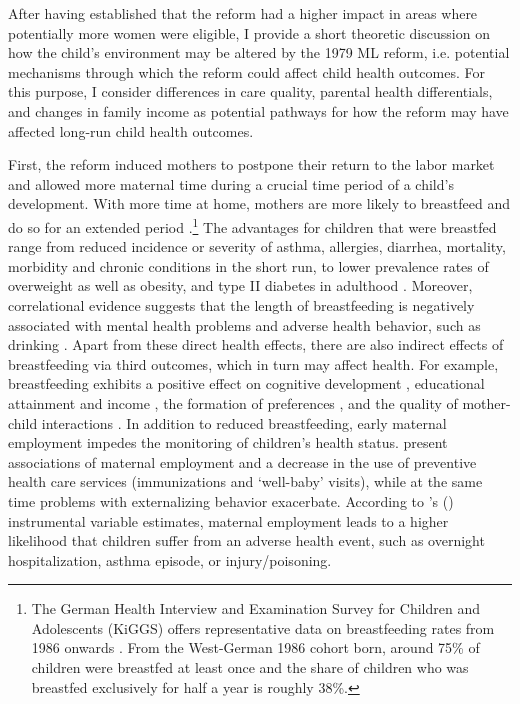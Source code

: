 
After having established that the reform had a higher impact in areas where potentially more women were eligible, I provide a short theoretic discussion on how the child's environment may be altered by the 1979 ML reform, i.e. potential mechanisms through which the reform could affect child health outcomes. For this purpose, I consider differences in care quality, parental health differentials, and changes in family income as potential pathways for how the reform may have affected long-run child health outcomes.%

First, the reform induced mothers to postpone their return to the labor market and allowed more maternal time during a crucial time period of a child's development. With more time at home, mothers are more likely to breastfeed and do so for an extended period \citep{baker2008maternal,berger2005earlymaternal}.\footnote{The German Health Interview and Examination Survey for Children and Adolescents (KiGGS) offers representative data on breastfeeding rates from 1986 onwards \citep{lange2007breastfeeding}. From the West-German 1986 cohort born, around 75\% of children were breastfed at least once and the share of children who was breastfed exclusively for half a year is roughly 38\%.} The advantages for children that were breastfed range from reduced incidence or severity of asthma, allergies, diarrhea, mortality, morbidity and chronic conditions in the short run, to lower prevalence rates of overweight as well as obesity, and type II diabetes in adulthood \citep{ruhm2000parental, victora2016breastfeeding}. Moreover, correlational evidence suggests that the length of breastfeeding is negatively associated with mental health problems and adverse health behavior, such as drinking \citep{oddy2010longterm,falk2016early}. Apart from these direct health effects, there are also indirect effects of breastfeeding via third outcomes, which in turn may affect health. For example, breastfeeding exhibits a positive effect on cognitive development \citep{albagli2018}, educational attainment and income \citep{victoria2015association}, the formation of preferences \citep{falk2016early}, and the quality of mother-child interactions \citep{papp2014longitudinal}. In addition to reduced breastfeeding, early maternal employment impedes the monitoring of children's health status. \cite{berger2005earlymaternal} present associations of maternal employment and a decrease in the use of preventive health care services (immunizations and `well-baby' visits), while at the same time problems with externalizing behavior exacerbate. According to \citeauthor{morrill2011}'s (\citeyear{morrill2011}) instrumental variable estimates, maternal employment leads to a higher likelihood that children suffer from an adverse health event, such as overnight hospitalization, asthma episode, or injury/poisoning.





